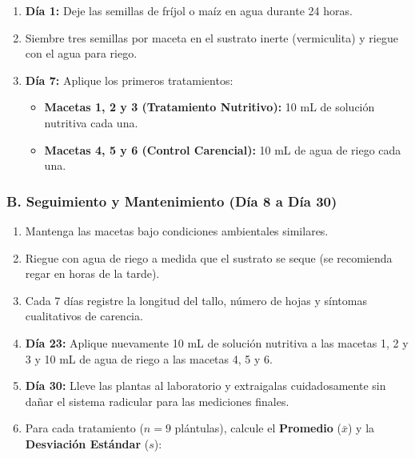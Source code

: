 \documentclass[
  spanish,
  10pt,
  letterpaper,
  twocolumn]{article}
\providecommand{\tightlist}{%
  \setlength{\itemsep}{0pt}\setlength{\parskip}{0pt}}
\begin{document}
\begin{enumerate}
\def\labelenumi{\arabic{enumi}.}
\tightlist
\item
  \textbf{Día 1:} Deje las semillas de fríjol o maíz en agua durante 24
  horas.
\item
  Siembre tres semillas por maceta en el sustrato inerte (vermiculita) y
  riegue con el agua para riego.
\item
  \textbf{Día 7:} Aplique los primeros tratamientos:

  \begin{itemize}
  \tightlist
  \item
    \textbf{Macetas 1, 2 y 3 (Tratamiento Nutritivo):} 10 mL de solución
    nutritiva cada una.
  \item
    \textbf{Macetas 4, 5 y 6 (Control Carencial):} 10 mL de agua de
    riego cada una.
  \end{itemize}
\end{enumerate}

\begin{center}
\end{center}

\subsubsection{B. Seguimiento y Mantenimiento (Día 8 a Día
30)}\label{b.-seguimiento-y-mantenimiento-duxeda-8-a-duxeda-30}

\begin{enumerate}
\def\labelenumi{\arabic{enumi}.}
\tightlist
\item
  Mantenga las macetas bajo condiciones ambientales similares.
\item
  Riegue con agua de riego a medida que el sustrato se seque (se
  recomienda regar en horas de la tarde).
\item
  Cada 7 días registre la longitud del tallo, número de hojas y síntomas
  cualitativos de carencia.
\item
  \textbf{Día 23:} Aplique nuevamente 10 mL de solución nutritiva a las
  macetas 1, 2 y 3 y 10 mL de agua de riego a las macetas 4, 5 y 6.
\item
  \textbf{Día 30:} Lleve las plantas al laboratorio y extraigalas
  cuidadosamente sin dañar el sistema radicular para las mediciones
  finales.
\item
  Para cada tratamiento (\(n=9\) plántulas), calcule el
  \textbf{Promedio} (\(\bar{x}\)) y la \textbf{Desviación Estándar}
  (\(s\)):
\end{enumerate}
\end{document}
